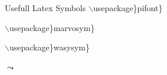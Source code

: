 \documentclass{beamer}
\begin{document}
\begin{frame}{Usefull Latex Symbols}
$\backslash$usepackage\}\alert{pifont}\}\par
{}{}{}{}{}{}
{}{}{}{}{}{}
{}{}{}{}{}{}
		
$\backslash$usepackage\}\alert{marvosym}\}\par
{\EUR}{\EURcr}{\EURdig}{\EURhv}{\EURtm}{\EyesDollar}{\Moon}{\Sun}{\Aries}
{\Cancer}{\Libra}{\Capricorn}{\Taurus}{\Leo}{\Scorpio}{\Aquarius}{\Gemini}
{\Virgo}{\Sagittarius}{\Pisces}{\Hexasteel}{\Octosteel}{\Rectpipe}
{\Rectsteel}{\Squarepipe}{\Squaresteel}{\FEMALE}{\Female}{\Male}{\MALE}
{\Biohazard}{\CEsign}{\Radioactivity}{\Stopsign}{\Forward}{\MoveDown}
{\MoveUp}{\Rewind}{\ToTop}{\ForwardToEnd}{\RewindToStart}{\ToBottom}
{\RewindToIndex}{\ForwardToIndex}{\ClockLogo}{\Coffeecup}{\PackingWaste}
{\Recycling}

$\backslash$usepackage\}\alert{wasysym}\}\par
{$\leadsto$}
{\mercury}{\earth}{\jupiter}{\uranus}{\pluto}{\venus}{\mars}{\saturn}
{\neptune}{\astrosun}{\fullmoon}{\leftmoon}{\newmoon}{\rightmoon}{\aries}
{\cancer}{\libra}{\aquarius}{\taurus}{\leo}{\scorpio}{\capricornus}
{\gemini}{\virgo}{\sagittarius}{\pisces}{\ascnode}{\descnode}{\conjunction}
{\opposition}{\vernal}{\female}{\male}{\CheckedBox}{\Square}{\XBox}
{\blacksmiley}{\smiley}
\end{frame}
\end{document}
